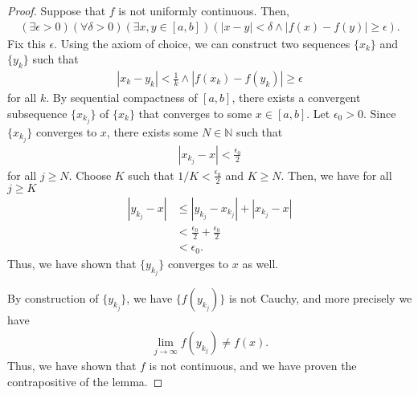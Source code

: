 \documentclass[10pt,a4paper]{article}
\theoremstyle{theorem}
\theoremstyle{definition}
\begin{document}
\begin{proof}
Suppose that $f$ is not uniformly continuous. Then,
\begin{align*}
(\exists \epsilon > 0)(\forall \delta > 0)(\exists x,y \in [a, b])(|x - y| < \delta \land |f(x) - f(y)| \geq \epsilon).
\end{align*}
Fix this $\epsilon$. Using the axiom of choice, we can construct two sequences $\{x_k\}$ and $\{y_k\}$ such that 
\begin{align*}
|x_k - y_k| < \frac{1}{k} \land |f(x_k) - f(y_k)| \geq \epsilon
\end{align*}
for all $k$. By sequential compactness of $[a, b]$, there exists a convergent subsequence $\{x_{k_j} \}$ of $\{x_k\}$ that converges to some $x \in [a, b]$.  Let $ \epsilon_0 > 0$.  Since $\{x_{k_j} \}$ converges to $x$, there exists some $N \in \mathbb{N}$ such that 
\begin{align*}
|x_{k_j} - x| < \frac{\epsilon_0}{2}
\end{align*}
for all $j \geq N$. Choose $K$ such that $1/K < \frac{\epsilon_0}{2}$ and $K \geq N$. Then, we have for all $j \geq K$
\begin{align*}
|y_{k_j} - x| &\leq |y_{k_j} - x_{k_j}| + |x_{k_j} - x|\\
&< \frac{\epsilon_0}{2} + \frac{\epsilon_0}{2}\\
&<\epsilon_0.
\end{align*}
Thus, we have shown that $\{ y_{k_j} \}$ converges to $x$ as well. 

By construction of $\{ y_{k_j} \}$, we have $\{f(y_{k_j}) \}$ is not Cauchy, and more precisely we have 
\begin{align*}
\lim_{j \to \infty} f(y_{k_j}) \not= f(x).
\end{align*}
Thus, we have shown that $f$ is not continuous, and we have proven the contrapositive of the lemma.
\end{proof}
\end{document}
